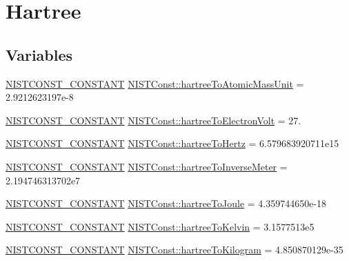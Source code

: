 \hypertarget{group___n_i_s_t_const-_hartree}{}\section{Hartree}
\label{group___n_i_s_t_const-_hartree}
\subsection*{Variables}
\begin{DoxyCompactItemize}
\item 
\mbox{\hyperlink{_n_i_s_t_const_8hpp_a2b0fc1d7452373f816175dd86ce26729}{N\+I\+S\+T\+C\+O\+N\+S\+T\+\_\+\+C\+O\+N\+S\+T\+A\+NT}} \mbox{\hyperlink{group___n_i_s_t_const-_hartree_gadd551bb415cf6590fe86cbab53282790}{N\+I\+S\+T\+Const\+::hartree\+To\+Atomic\+Mass\+Unit}} = 2.\+9212623197e-\/8
\item 
\mbox{\hyperlink{_n_i_s_t_const_8hpp_a2b0fc1d7452373f816175dd86ce26729}{N\+I\+S\+T\+C\+O\+N\+S\+T\+\_\+\+C\+O\+N\+S\+T\+A\+NT}} \mbox{\hyperlink{group___n_i_s_t_const-_hartree_gaba497bbf24c554950d652cdfa84b102c}{N\+I\+S\+T\+Const\+::hartree\+To\+Electron\+Volt}} = 27.
\item 
\mbox{\hyperlink{_n_i_s_t_const_8hpp_a2b0fc1d7452373f816175dd86ce26729}{N\+I\+S\+T\+C\+O\+N\+S\+T\+\_\+\+C\+O\+N\+S\+T\+A\+NT}} \mbox{\hyperlink{group___n_i_s_t_const-_hartree_gabf95934e6d5fe9b153d31d35a67a190c}{N\+I\+S\+T\+Const\+::hartree\+To\+Hertz}} = 6.\+579683920711e15
\item 
\mbox{\hyperlink{_n_i_s_t_const_8hpp_a2b0fc1d7452373f816175dd86ce26729}{N\+I\+S\+T\+C\+O\+N\+S\+T\+\_\+\+C\+O\+N\+S\+T\+A\+NT}} \mbox{\hyperlink{group___n_i_s_t_const-_hartree_ga7b651bbca9217e235a1276cfdaac9d6e}{N\+I\+S\+T\+Const\+::hartree\+To\+Inverse\+Meter}} = 2.\+194746313702e7
\item 
\mbox{\hyperlink{_n_i_s_t_const_8hpp_a2b0fc1d7452373f816175dd86ce26729}{N\+I\+S\+T\+C\+O\+N\+S\+T\+\_\+\+C\+O\+N\+S\+T\+A\+NT}} \mbox{\hyperlink{group___n_i_s_t_const-_hartree_ga477b51b8a0e743da7b56031105b4dd38}{N\+I\+S\+T\+Const\+::hartree\+To\+Joule}} = 4.\+359744650e-\/18
\item 
\mbox{\hyperlink{_n_i_s_t_const_8hpp_a2b0fc1d7452373f816175dd86ce26729}{N\+I\+S\+T\+C\+O\+N\+S\+T\+\_\+\+C\+O\+N\+S\+T\+A\+NT}} \mbox{\hyperlink{group___n_i_s_t_const-_hartree_ga11349ff8dc3b4b39764521c290d59ec1}{N\+I\+S\+T\+Const\+::hartree\+To\+Kelvin}} = 3.\+1577513e5
\item 
\mbox{\hyperlink{_n_i_s_t_const_8hpp_a2b0fc1d7452373f816175dd86ce26729}{N\+I\+S\+T\+C\+O\+N\+S\+T\+\_\+\+C\+O\+N\+S\+T\+A\+NT}} \mbox{\hyperlink{group___n_i_s_t_const-_hartree_ga61c0da502aec40e97aaa90bbbaf8afb2}{N\+I\+S\+T\+Const\+::hartree\+To\+Kilogram}} = 4.\+850870129e-\/35
\end{DoxyCompactItemize}


